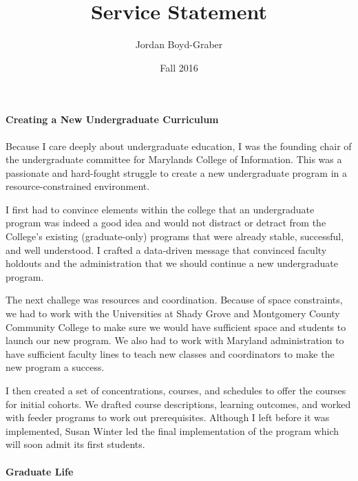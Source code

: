 \documentclass[11pt]{amsart}
\begin{document}
 \title{Service Statement}

 \author{Jordan Boyd-Graber}
\address{University of Colorado}

\date{Fall 2016}


\keywords{}

\maketitle

\paragraph{Creating a New Undergraduate Curriculum}

Because I care deeply about undergraduate education, I was the founding chair of
the undergraduate committee for Marylands College of Information.  This was a
passionate and hard-fought struggle to create a new undergraduate program in a
resource-constrained environment.

I first had to convince elements within the college that an undergraduate
program was indeed a good idea and would not distract or detract from the
College's existing (graduate-only) programs that were already stable,
successful, and well understood.  I crafted a data-driven message that convinced
faculty holdouts and the administration that we should continue a new
undergraduate program.

The next challege was resources and coordination.  Because of space constraints,
we had to work with the Universities at Shady Grove and Montgomery County
Community College to make sure we would have sufficient space and students to
launch our new program.  We also had to work with Maryland administration to
have sufficient faculty lines to teach new classes and coordinators to make the
new program a success.

I then created a set of concentrations, courses, and schedules to offer the
courses for initial cohorts.  We drafted course descriptions, learning outcomes,
and worked with feeder programs to work out prerequisites.  Although I left
before it was implemented, Susan Winter led the final implementation of the
program which will soon admit its first students.

\paragraph{Graduate Life}
\end{document}
